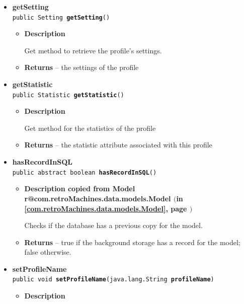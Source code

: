 \documentclass[11pt,a4paper]{report}
\makeatletter
\newcommand{\refdefined}[1]{
\expandafter\ifx\csname r@#1\endcsname\relax
\relax\else
{$($in \ref{#1}, page \pageref{#1}$)$}\fi}
\makeatother
\begin{document}
{{{{{\begin{itemize}
{\begin{itemize}
{Get method to retrieve the name of the profile.
}
\item{{\bf  Returns} -- 
the name of the profile 
}%
\end{itemize}
}%
\item{ 
{\bf  getSetting}\\
\texttt{public Setting\ {\bf  getSetting}()
\label{com.retroMachines.data.models.Profile.getSetting()}}%
\begin{itemize}
\item{
{\bf  Description}

Get method to retrieve the profile's settings.
}
\item{{\bf  Returns} -- 
the settings of the profile 
}%
\end{itemize}
}%
\item{ 
{\bf  getStatistic}\\
\texttt{public Statistic\ {\bf  getStatistic}()
\label{com.retroMachines.data.models.Profile.getStatistic()}}%
\begin{itemize}
\item{
{\bf  Description}

Get method for the statistics of the profile
}
\item{{\bf  Returns} -- 
the statistic attribute associated with this profile 
}%
\end{itemize}
}%
\item{ 
{\bf  hasRecordInSQL}\\
\texttt{public abstract boolean\ {\bf  hasRecordInSQL}()
\label{com.retroMachines.data.models.Profile.hasRecordInSQL()}}%
\begin{itemize}
\item{
{\bf  Description copied from Model{\small \refdefined{com.retroMachines.data.models.Model}} }

Checks if the database has a previous copy for the model.
}
\item{{\bf  Returns} -- 
true if the background storage has a record for the model; false otherwise. 
}%
\end{itemize}
}%
\item{ 
{\bf  setProfileName}\\
\texttt{public void\ {\bf  setProfileName}(\texttt{java.lang.String} {\bf  profileName})
\label{com.retroMachines.data.models.Profile.setProfileName(java.lang.String)}}%
\begin{itemize}
\item{
{\bf  Description}

}
\end{itemize}}
\end{itemize}}}}}}
\end{document}
